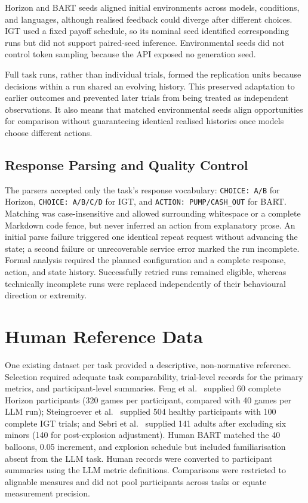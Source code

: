 \documentclass[logo,msc,inf]{infthesis}       %
\begin{document}
Horizon and BART seeds aligned initial environments across models, conditions, and languages, although realised feedback could diverge after different choices. IGT used a fixed payoff schedule, so its nominal seed identified corresponding runs but did not support paired-seed inference. Environmental seeds did not control token sampling because the API exposed no generation seed.

Full task runs, rather than individual trials, formed the replication units because decisions within a run shared an evolving history. This preserved adaptation to earlier outcomes and prevented later trials from being treated as independent observations. It also means that matched environmental seeds align opportunities for comparison without guaranteeing identical realised histories once models choose different actions.

\subsection{Response Parsing and Quality Control}

The parsers accepted only the task's response vocabulary: \texttt{CHOICE: A/B} for Horizon, \texttt{CHOICE: A/B/C/D} for IGT, and \texttt{ACTION: PUMP/CASH\_OUT} for BART. Matching was case-insensitive and allowed surrounding whitespace or a complete Markdown code fence, but never inferred an action from explanatory prose. An initial parse failure triggered one identical repeat request without advancing the state; a second failure or unrecoverable service error marked the run incomplete. Formal analysis required the planned configuration and a complete response, action, and state history. Successfully retried runs remained eligible, whereas technically incomplete runs were replaced independently of their behavioural direction or extremity.

\section{Human Reference Data}

One existing dataset per task provided a descriptive, non-normative reference. Selection required adequate task comparability, trial-level records for the primary metrics, and participant-level summaries. Feng et al.~\cite{Feng2021ExploreExploit} supplied 60 complete Horizon participants (320 games per participant, compared with 40 games per LLM run); Steingroever et al.~\cite{Steingroever2015IGTData} supplied 504 healthy participants with 100 complete IGT trials; and Sebri et al.~\cite{Sebri2023BART} supplied 141 adults after excluding six minors (140 for post-explosion adjustment). Human BART matched the 40 balloons, 0.05 increment, and explosion schedule but included familiarisation absent from the LLM task. Human records were converted to participant summaries using the LLM metric definitions. Comparisons were restricted to alignable measures and did not pool participants across tasks or equate measurement precision.
\end{document}
